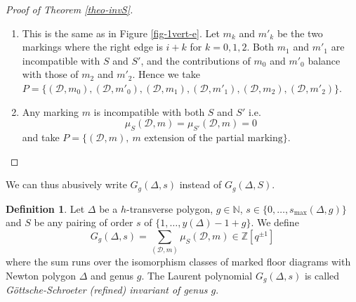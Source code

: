 \documentclass[11pt]{article}
\theoremstyle{definition}
\newtheorem{defi}[theo]{Definition}
\numberwithin{equation}{section}
\newcommand{\N}{\mathbb{N}}
\newcommand{\Z}{\mathbb{Z}}
\newcommand{\D}{\mathcal{D}}
\newcommand{\dsum}{\displaystyle\sum}
\newcommand{\smax}{s_{\max}}
\newcommand{\muSDm}{\mu_S(\D,m)}
\newcommand{\muSSDm}{\mu_{S'}(\D,m)}
\theoremstyle{plain}
\begin{document}
\begin{proof}[Proof of Theorem \ref{theo-invS}]
\begin{enumerate}[label=(\alph*)]
\begin{table}[ht]
\renewcommand{\arraystretch}{1.5}
\centering
\[ 
\begin{array}{|c||c|c|}
\hline
  & S  & S' \\
\hline
\hline
(i,i+1,i+2) & \dfrac{[\omega_1][\omega_2][\omega_1 + \omega_2]}{[2]} [\omega_3]^2 & \dfrac{[\omega_2][\omega_3][\omega_2 + \omega_3]}{[2]} [\omega_1]^2  \\
\hline 
(i,i+2,i+1) & 0 & \dfrac{[\omega_2][\omega_3][\omega_2 + \omega_3]}{[2]} [\omega_1]^2   \\
\hline 
(i+1,i,i+2) & \dfrac{[\omega_1][\omega_2][\omega_1 + \omega_2]}{[2]} [\omega_3]^2 & 0   \\
\hline 
(i+1,i+2,i) & 0 & \dfrac{[\omega_1][\omega_2][\omega_1 + \omega_2]}{[2]} [\omega_3]^2   \\
\hline 
(i+2,i,i+1) & \dfrac{[\omega_2][\omega_3][\omega_2 + \omega_3]}{[2]} [\omega_1]^2 & 0  \\
\hline 
(i+2,i+1,i) & \dfrac{[\omega_2][\omega_3][\omega_2 + \omega_3]}{[2]} [\omega_1]^2 & \dfrac{[\omega_1][\omega_2][\omega_1 + \omega_2]}{[2]} [\omega_3]^2    \\
\hline 
\end{array} \]
\caption{Contribution of the markings in case (b).}
\label{table-contrib-0vert-b}
\end{table}

\item This is the same as in Figure \ref{fig-1vert-e}. Let $m_k$ and $m'_k$ be the two markings where the right edge is $i+k$ for $k=0,1,2$. Both $m_1$ and $m'_1$ are incompatible with $S$ and $S'$, and the contributions of $m_0$ and $m'_0$ balance with those of $m_2$ and $m'_2$. Hence we take $P = \{ (\D,m_0), (\D,m'_0), (\D,m_1), (\D,m'_1), (\D,m_2), (\D,m'_2) \}$.

\item Any marking $m$ is incompatible with both $S$ and $S'$ i.e.  
\[ \muSDm = \muSSDm = 0 \]
and take $P = \{(\D,m),\ m \text{ extension of the partial marking} \}$.
\end{enumerate}
\end{proof}

We can thus abusively write $G_g(\Delta,s)$ instead of $G_g(\Delta,S)$.\begin{defi}\label{def-combi-GS-inv}
Let $\Delta$ be a $h$-transverse polygon, $g\in\N$, $s\in \{0,\dots,\smax(\Delta,g)\}$ and $S$ be any pairing  of order $s$ of $\{1,\dots, y(\Delta)-1+g \}$. We define 
\[ G_g(\Delta,s) = \dsum_{(\D,m)} \mu_S(\D,m) \in \Z[q^{\pm1}] \]
where the sum runs over the isomorphism classes of marked floor diagrams with Newton polygon $\Delta$ and genus $g$.
The Laurent polynomial $G_g(\Delta,s)$ is called \emph{Göttsche-Schroeter (refined) invariant of genus $g$}.
\end{defi}
\end{document}

